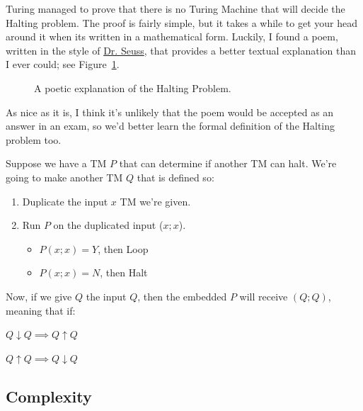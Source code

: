 Turing managed to prove that there is no Turing Machine that will decide the
Halting problem. The proof is fairly simple, but it takes a while to get your
head around it when its written in a mathematical form. Luckily, I found a poem,
written in the style of \href{https://en.wikipedia.org/wiki/Dr._Seuss}{Dr.
Seuss}, that provides a better textual explanation than I ever could; see
Figure~\ref{fig:halting-poem}.

\begin{figure}[h]
\begin{minipage}{\textwidth}
  \begin{mymulticols}
  
  \end{mymulticols}
  \restoregeometry
\end{minipage}
\caption{A poetic explanation of the Halting Problem.}
\label{fig:halting-poem}
\end{figure}

As nice as it is, I think it's unlikely that the poem would be accepted as an
answer in an exam, so we'd better learn the formal definition of the Halting
problem too.

Suppose we have a TM $P$ that can determine if another TM can halt. We're going
to make another TM $Q$ that is defined so:

\begin{enumerate}
  \item Duplicate the input $x$ TM we're given.
  \item Run $P$ on the duplicated input ($x;x$).
  \begin{itemize}
    \item[] $P(x;x) = Y$, then Loop 
    \item[] $P(x;x) = N$, then Halt
  \end{itemize}
\end{enumerate}

Now, if we give $Q$ the input $Q$, then the embedded $P$ will receive $(Q;Q)$,
meaning that if:

\begin{description}
  \item $Q \downarrow Q \implies Q \uparrow Q$
  \item $Q \uparrow Q \implies Q \downarrow Q$
\end{description}


\subsection{Complexity}

